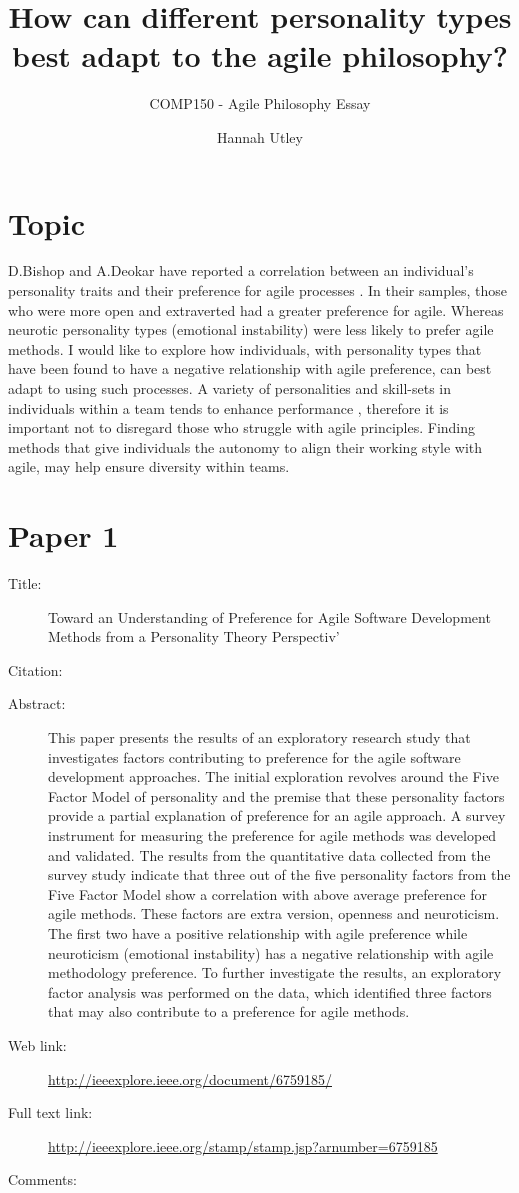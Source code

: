 \documentclass{scrartcl}
\title{How can different personality types best adapt to the agile philosophy?}
\subtitle{COMP150 - Agile Philosophy Essay}
\author{Hannah Utley}
\begin{document}
\maketitle

\section*{Topic}

D.Bishop and A.Deokar have reported a correlation between an individual’s personality traits and their preference for agile processes 
\cite{Paper1}. In their samples, those who were more open and extraverted had a greater preference for agile. Whereas neurotic 
personality types (emotional instability) were less likely to prefer agile methods. I would like to explore how individuals, with 
personality types that have been found to have a negative relationship with agile preference, can best adapt to using such processes. A 
variety of personalities and skill-sets in individuals within a team tends to enhance performance \cite{Paper3}, therefore it is 
important not to disregard those who struggle with agile principles. Finding methods that give individuals the autonomy to align their 
working style with agile, may help ensure diversity within teams.

\section*{Paper 1}
\begin{description}
\item[Title:] Toward an Understanding of Preference for Agile Software Development Methods from a Personality Theory Perspectiv'
\item[Citation:] \cite{Paper1}
\item[Abstract:] This paper presents the results of an exploratory research study that investigates factors contributing to preference 
for the agile software development approaches. The initial exploration revolves around the Five Factor Model of personality and the 
premise that these personality factors provide a partial explanation of preference for an agile approach. A survey instrument for 
measuring the preference for agile methods was developed and validated. The results from the quantitative data collected from the survey 
study indicate that three out of the five personality factors from the Five Factor Model show a correlation with above average 
preference for agile methods. These factors are extra version, openness and neuroticism. The first two have a positive relationship with 
agile preference while neuroticism (emotional instability) has a negative relationship with agile methodology preference. To further 
investigate the results, an exploratory factor analysis was performed on the data, which identified three factors that may also 
contribute to a preference for agile methods.
\item[Web link:] \url{http://ieeexplore.ieee.org/document/6759185/}
\item[Full text link:] \url{http://ieeexplore.ieee.org/stamp/stamp.jsp?arnumber=6759185}
\item[Comments:] 
\end{description}
\end{document}

